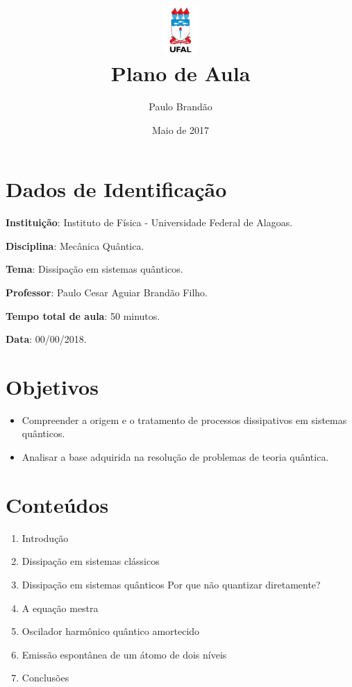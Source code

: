 \documentclass{article}
\title{\includegraphics[width=0.1\textwidth]{ufallogo.png} \\
\Huge{\color{astral}\textbf{Plano de Aula}}}
\author{Paulo Brandão}
\date{Maio de 2017}
\begin{document}
\maketitle

\section{Dados de Identificação}

\noindent \textbf{Instituição}: Instituto de Física - Universidade Federal de Alagoas.

\noindent \textbf{Disciplina}: Mecânica Quântica.

\noindent \textbf{Tema}: Dissipação em sistemas quânticos.

\noindent \textbf{Professor}: Paulo Cesar Aguiar Brandão Filho.

\noindent \textbf{Tempo total de aula}: 50 minutos.

\noindent \textbf{Data}: 00/00/2018.

\section{Objetivos}

\begin{itemize}
    \item Compreender a origem e o tratamento de processos dissipativos em sistemas quânticos.
    \item Analisar a base adquirida na resolução de problemas de teoria quântica.
\end{itemize}

\section{Conteúdos}

\begin{enumerate}
    \item Introdução
    \item Dissipação em sistemas clássicos
    \item Dissipação em sistemas quânticos
     Por que não quantizar diretamente? 
    \item A equação mestra
    \item Oscilador harmônico quântico amortecido
    \item Emissão espontânea de um átomo de dois níveis
    \item Conclusões
\end{enumerate}
\end{document}
